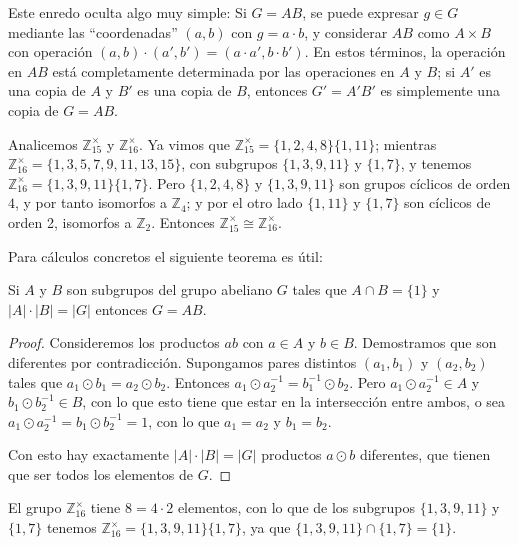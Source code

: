   Este enredo oculta algo muy simple:
  Si \(G = A B\),
  se puede expresar \(g \in G\) mediante las ``coordenadas''
  \((a, b)\) con \(g = a \cdot b\),
  y considerar \(A B\) como \(A \times B\) con operación
  \((a, b) \cdot (a', b') = (a \cdot a', b \cdot b')\).
  En estos términos,
  la operación en \(A B\) está completamente determinada
  por las operaciones en \(A\) y \(B\);
  si \(A'\) es una copia de \(A\)
  y \(B'\) es una copia de \(B\),
  entonces \(G' = A' B'\)
  es simplemente una copia de \(G = A B\).

  Analicemos \(\mathbb{Z}^\times_{15}\) y \(\mathbb{Z}^\times_{16}\).
  Ya vimos que \(\mathbb{Z}^\times_{15} = \{1, 2, 4, 8\} \{1, 11\}\);
  mientras \(\mathbb{Z}^\times_{16} = \{1, 3, 5, 7, 9, 11, 13, 15\}\),
  con subgrupos \(\{1, 3, 9, 11\}\) y \(\{1, 7\}\),
  y tenemos \(\mathbb{Z}^\times_{16} = \{1, 3, 9, 11\} \{1, 7\}\).
  Pero \(\{1, 2, 4, 8\}\) y \(\{1, 3, 9, 11\}\)
  son grupos cíclicos de orden \(4\),
  y por tanto isomorfos a \(\mathbb{Z}_4\);
  y por el otro lado \(\{1, 11\}\) y \(\{1, 7\}\) son cíclicos de orden 2,
  isomorfos a \(\mathbb{Z}_2\).
  Entonces \(\mathbb{Z}^\times_{15} \cong \mathbb{Z}^\times_{16}\).

  Para cálculos concretos el siguiente teorema es útil:
  \begin{theorem}
    \label{theo:subgrupo-suma-directa}
    Si \(A\) y \(B\) son subgrupos del grupo abeliano \(G\)
    tales que \(A \cap B = \{1\}\)
    y \(\lvert A \rvert \cdot \lvert B \rvert = \lvert G \rvert\)
    entonces \(G = A B\).
  \end{theorem}
  \begin{proof}
    Consideremos los productos \(a b\)
    con \(a \in A\) y \(b \in B\).
    Demostramos que son diferentes por contradicción.
    Supongamos pares distintos \((a_1, b_1)\) y \((a_2, b_2)\)
    tales que \(a_1 \odot b_1 = a_2 \odot b_2\).
    Entonces \(a_1 \odot a_2^{-1} = b_1^{-1} \odot b_2\).
    Pero \(a_1 \odot a_2^{-1} \in A\)
    y \(b_1 \odot b_2^{-1} \in B\),
    con lo que esto tiene que estar en la intersección entre ambos,
    o sea \(a_1 \odot a_2^{-1} = b_1 \odot b_2^{-1} = 1\),
    con lo que \(a_1 = a_2\) y \(b_1 = b_2\).

    Con esto hay exactamente
      \(\lvert A \rvert \cdot \lvert B \rvert = \lvert G \rvert\)
    productos \(a \odot b\) diferentes,
    que tienen que ser todos los elementos de \(G\).
  \end{proof}
  El grupo \(\mathbb{Z}^\times_{16}\) tiene \(8 = 4 \cdot 2\) elementos,
  con lo que de los subgrupos \(\{1, 3, 9, 11\}\) y \(\{1, 7\}\)
  tenemos \(\mathbb{Z}^\times_{16} = \{1, 3, 9, 11\} \{1, 7\}\),
  ya que \(\{1, 3, 9, 11\} \cap \{1, 7\} = \{1\}\).

